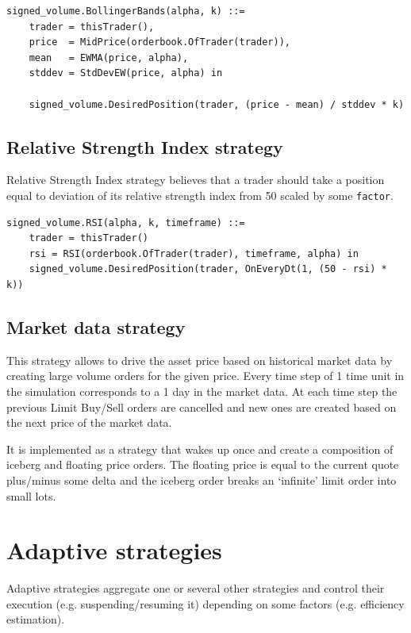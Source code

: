 \documentclass[a4paper,11pt]{article}
\begin{document}
\begin{verbatim}
signed_volume.BollingerBands(alpha, k) ::=
    trader = thisTrader(),
    price  = MidPrice(orderbook.OfTrader(trader)),
    mean   = EWMA(price, alpha),
    stddev = StdDevEW(price, alpha) in

    signed_volume.DesiredPosition(trader, (price - mean) / stddev * k)
\end{verbatim}

\subsection{Relative Strength Index
strategy}\label{relative-strength-index-strategy}

Relative Strength Index strategy believes that a trader should take a
position equal to deviation of its relative strength index from 50
scaled by some \texttt{factor}.

\begin{verbatim}
signed_volume.RSI(alpha, k, timeframe) ::=
    trader = thisTrader()
    rsi = RSI(orderbook.OfTrader(trader), timeframe, alpha) in
    signed_volume.DesiredPosition(trader, OnEveryDt(1, (50 - rsi) * k))
\end{verbatim}

\subsection{Market data strategy}\label{market-data-strategy}

This strategy allows to drive the asset price based on historical market
data by creating large volume orders for the given price. Every time
step of 1 time unit in the simulation corresponds to a 1 day in the
market data. At each time step the previous Limit Buy/Sell orders are
cancelled and new ones are created based on the next price of the market
data.

It is implemented as a strategy that wakes up once and create a
composition of iceberg and floating price orders. The floating price is
equal to the current quote plus/minus some delta and the iceberg order
breaks an `infinite' limit order into small lots.

\section{Adaptive strategies}\label{adaptive-strategies}

Adaptive strategies aggregate one or several other strategies and
control their execution (e.g. suspending/resuming it) depending on some
factors (e.g. efficiency estimation).
\end{document}
